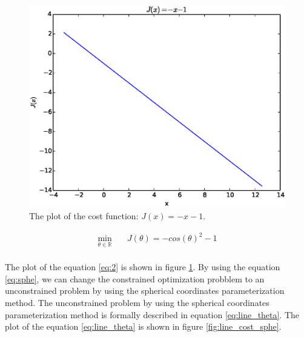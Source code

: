 \documentclass[a4paper,12pt]{article}
\begin{document}
\begin{figure}[H]
\begin{center}
\includegraphics[width=1.0\linewidth]{line.eps}

\end{center}
   \caption{The plot of the cost function: $J(x) = -x-1$.  }
\label{fig:line_cost}
\end{figure}

\begin{equation}\label{eq:line_theta}
\begin{aligned}
\min_{\theta\in \mathbb{R}} \quad & J(\theta) = -cos(\theta)^2-1\\
\end{aligned}
\end{equation}

The plot of the equation \ref{eq:2} is shown in figure \ref{fig:line_cost}. By using the equation \ref{eq:sphe}, we can change the constrained optimization probblem to an unconstrained problem by using the spherical coordinates parameterization method. The unconstrained problem by using the spherical coordinates parameterization method is formally described in equation \ref{eq:line_theta}. The plot of the equation \ref{eq:line_theta} is shown in figure \ref{fig:line_cost_sphe}.\\  


\end{document}
